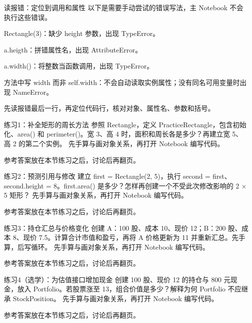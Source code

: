 \documentclass[9pt]{ctexbeamer}
\begin{document}
\begin{frame}{读报错：定位到调用和属性}
以下是需要手动尝试的错误写法，主 Notebook 不会执行这些错误。
\par
Rectangle(3)：缺少 height 参数，出现 TypeError。
\par
a.heigth：拼错属性名，出现 AttributeError。
\par
a.width()：将整数当函数调用，出现 TypeError。
\par
方法中写 width 而非 self.width：不会自动读取实例属性；没有同名可用变量时出现 NameError。
\par
先读报错最后一行，再定位代码行，核对对象、属性名、参数和括号。
\par{}

\end{frame}

\begin{frame}{练习1：补全矩形的周长方法}
参照 Rectangle，定义 PracticeRectangle，包含初始化、area() 和 perimeter()。宽 3、高 4 时，面积和周长各是多少？再建立宽 5、高 2 的第二个实例。
\vspace{0.5cm}
先手算与画对象关系，再打开 Notebook 编写代码。\par 参考答案放在本节练习之后，讨论后再翻页。
\end{frame}

\begin{frame}{练习2：预测引用与修改}
建立 first = Rectangle(2, 5)，执行 second = first、second.height = 8。first.area() 是多少？怎样再创建一个不受此次修改影响的 2 × 5 矩形？
\vspace{0.5cm}
先手算与画对象关系，再打开 Notebook 编写代码。\par 参考答案放在本节练习之后，讨论后再翻页。
\end{frame}

\begin{frame}{练习3：持仓汇总与价格变化}
创建 A：100 股、成本 10、现价 12；B：200 股、成本 8、现价 7.5。计算合计市值和盈亏，再将 A 价格更新为 11 并重新汇总。先手算，后写循环。
\vspace{0.5cm}
先手算与画对象关系，再打开 Notebook 编写代码。\par 参考答案放在本节练习之后，讨论后再翻页。
\end{frame}

\begin{frame}{练习4（选学）：为估值接口增加现金}
创建 100 股、现价 12 的持仓与 800 元现金，放入 Portfolio。若股票涨至 13，组合价值是多少？解释为何 Portfolio 不应继承 StockPosition。
\vspace{0.5cm}
先手算与画对象关系，再打开 Notebook 编写代码。\par 参考答案放在本节练习之后，讨论后再翻页。
\end{frame}
\end{document}
